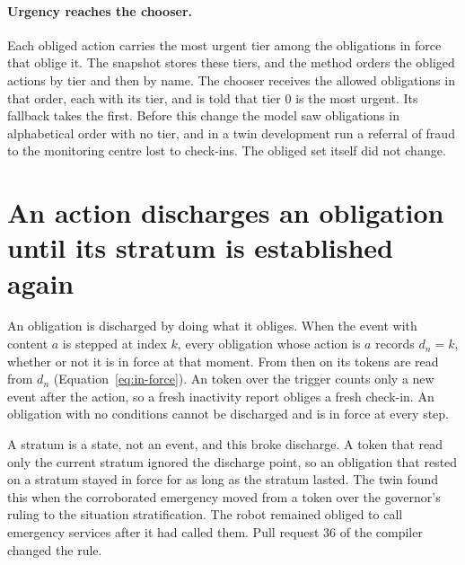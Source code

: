 \paragraph{Urgency reaches the chooser.}
Each obliged action carries the most urgent tier among the obligations in force that oblige it. The
snapshot stores these tiers, and the method  orders the obliged actions
by tier and then by name. The chooser receives the allowed obligations in that order, each with its
tier, and is told that tier 0 is the most urgent. Its fallback takes the first. Before this change
the model saw obligations in alphabetical order with no tier, and in a twin development run a
referral of fraud to the monitoring centre lost to check-ins. The obliged set itself did not change.

\section{An action discharges an obligation until its stratum is established again}\label{sec:runtime-discharge}

An obligation is discharged by doing what it obliges. When the event  with
content $a$ is stepped at index $k$, every obligation whose action is $a$ records $d_n = k$, whether
or not it is in force at that moment. From then on its tokens are read from $d_n$
(Equation~\ref{eq:in-force}). An  token over the trigger counts only a new event after
the action, so a fresh inactivity report obliges a fresh check-in. An obligation with no conditions
cannot be discharged and is in force at every step.

A stratum is a state, not an event, and this broke discharge. A token that read only the current
stratum ignored the discharge point, so an obligation that rested on a stratum stayed in force for
as long as the stratum lasted. The twin found this when the corroborated emergency moved from a
 token over the governor's ruling to the situation stratification. The robot remained
obliged to call emergency services after it had called them. Pull request 36 of the compiler
changed the rule.

